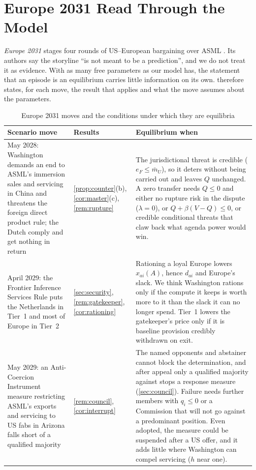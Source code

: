 \section{Europe 2031 Read Through the Model}\label{app:scenario}

\emph{Europe 2031} stages four rounds of US--European bargaining over ASML \citep{juijn2026europe}. Its authors say the storyline ``is not meant to be a prediction'', and we do not treat it as evidence. With as many free parameters as our model has, the statement that an episode is an equilibrium carries little information on its own.  therefore states, for each move, the result that applies and what the move assumes about the parameters.

\begin{table}[!tp]
\centering
\footnotesize
\caption{Europe 2031 moves and the conditions under which they are equilibria}\label{tab:scenario}
\begin{tabularx}{\textwidth}{@{}>{\raggedright\arraybackslash}p{3.6cm}>{\raggedright\arraybackslash}p{2.3cm}>{\raggedright\arraybackslash}X@{}}
\toprule
Scenario move & Results & Equilibrium when\\
\midrule
May 2028: Washington demands an end to ASML's immersion sales and servicing in China and threatens the foreign direct product rule; the Dutch comply and get nothing in return &
\cref{prop:counter}(b), \cref{cor:master}(c), \cref{rem:rupture} &
The jurisdictional threat is credible ($e_F\le\bar m_U$), so it deters without being carried out and leaves $Q$ unchanged. A zero transfer needs $Q\le 0$ and either no rupture risk in the dispute ($\lambda=0$), or $Q+\beta(V-Q)\le 0$, or credible conditional threats that claw back what agenda power would win.\\
\addlinespace
April 2029: the Frontier Inference Services Rule puts the Netherlands in Tier~1 and most of Europe in Tier~2 &
\cref{sec:security}, \cref{rem:gatekeeper}, \cref{cor:rationing} &
Rationing a loyal Europe lowers $x_{ai}(A)$, hence $d_{ai}$ and Europe's slack. We think Washington rations only if the compute it keeps is worth more to it than the slack it can no longer spend. Tier~1 lowers the gatekeeper's price only if it is baseline provision credibly withdrawn on exit.\\
\addlinespace
May 2029: an Anti-Coercion Instrument measure restricting ASML's exports and servicing to US fabs in Arizona falls short of a qualified majority &
\cref{rem:council}, \cref{cor:interrupt} &
The named opponents and abstainer cannot block the determination, and after appeal only a qualified majority against stops a response measure (\cref{sec:council}). Failure needs further members with $q_i\le 0$ or a Commission that will not go against a predominant position. Even adopted, the measure could be suspended after a US offer, and it adds little where Washington can compel servicing ($h$ near one).\\

\end{tabularx}
\end{table}
